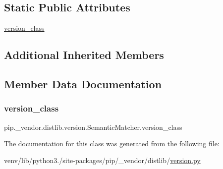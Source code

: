 \subsection*{Static Public Attributes}
\begin{DoxyCompactItemize}
\item 
\hyperlink{classpip_1_1__vendor_1_1distlib_1_1version_1_1SemanticMatcher_a4d716ea7573e7b2777af296034be6437}{version\+\_\+class}
\end{DoxyCompactItemize}
\subsection*{Additional Inherited Members}


\subsection{Member Data Documentation}
\mbox{\label{classpip_1_1__vendor_1_1distlib_1_1version_1_1SemanticMatcher_a4d716ea7573e7b2777af296034be6437}} 
\subsubsection{\texorpdfstring{version\+\_\+class}{version\_class}}
{\footnotesize\ttfamily pip.\+\_\+vendor.\+distlib.\+version.\+Semantic\+Matcher.\+version\+\_\+class\hspace{0.3cm}{\ttfamily [static]}}



The documentation for this class was generated from the following file\+:\begin{DoxyCompactItemize}
\item 
venv/lib/python3./site-\/packages/pip/\+\_\+vendor/distlib/\hyperlink{pip_2__vendor_2distlib_2version_8py}{version.\+py}\end{DoxyCompactItemize}
